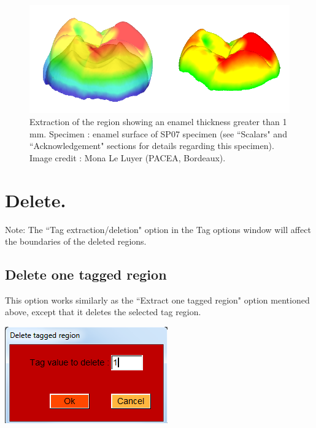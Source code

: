 \begin{figure}
  \centering
  \includegraphics[scale=0.25]{images/Tags/Extract_range.png} 
	\caption{Extraction of the region showing an enamel thickness greater than 1 mm. Specimen : enamel surface of SP07 specimen (see ``Scalars" and ``Acknowledgement" sections for details regarding this specimen). Image credit : Mona Le Luyer (PACEA, Bordeaux).}
\label{extract_scalar_range}
 
\end{figure}



\section{Delete.}

Note: The ``Tag extraction/deletion" option in the Tag options window will affect the boundaries of the deleted regions.
\subsection{Delete one tagged region}
\noindent
\begin{minipage}{0.5\textwidth}
This option works similarly as the ``Extract one tagged
region" option mentioned above, except that it deletes the
selected tag region.
\end{minipage}    
\begin{minipage}{0.5\textwidth}\centering
  \includegraphics[scale=0.5]{images/Tags/Delete_one_tagged_region.png}
 \end{minipage} 
\noindent




